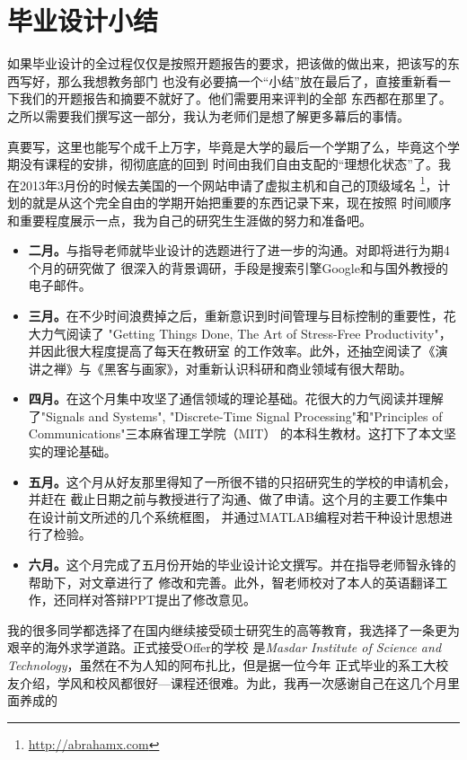 \chapter*{毕业设计小结}
如果毕业设计的全过程仅仅是按照开题报告的要求，把该做的做出来，把该写的东西写好，那么我想教务部门
也没有必要搞一个“小结”放在最后了，直接重新看一下我们的开题报告和摘要不就好了。他们需要用来评判的全部
东西都在那里了。之所以需要我们撰写这一部分，我认为老师们是想了解更多幕后的事情。
\par
真要写，这里也能写个成千上万字，毕竟是大学的最后一个学期了么，毕竟这个学期没有课程的安排，彻彻底底的回到
时间由我们自由支配的“理想化状态”了。我在2013年3月份的时候去美国的一个网站申请了虚拟主机和自己的顶级域名
\footnote{\url{http://abrahamx.com}}，计划的就是从这个完全自由的学期开始把重要的东西记录下来，现在按照
时间顺序和重要程度展示一点，我为自己的研究生生涯做的努力和准备吧。
\begin{itemize}
  \item \textbf{二月。}与指导老师就毕业设计的选题进行了进一步的沟通。对即将进行为期4个月的研究做了
  很深入的背景调研，手段是搜索引擎Google和与国外教授的电子邮件。
  \item \textbf{三月。}在不少时间浪费掉之后，重新意识到时间管理与目标控制的重要性，花大力气阅读了
  "Getting Things Done, The Art of Stress-Free Productivity"，并因此很大程度提高了每天在教研室
  的工作效率。此外，还抽空阅读了《演讲之禅》与《黑客与画家》，对重新认识科研和商业领域有很大帮助。
  \item \textbf{四月。}在这个月集中攻坚了通信领域的理论基础。花很大的力气阅读并理解了"Signals and
  Systems", "Discrete-Time Signal Processing"和"Principles of Communications"三本麻省理工学院（MIT）
  的本科生教材。这打下了本文坚实的理论基础。
  \item \textbf{五月。}这个月从好友那里得知了一所很不错的只招研究生的学校的申请机会，并赶在
  截止日期之前与教授进行了沟通、做了申请。这个月的主要工作集中在设计前文所述的几个系统框图，
  并通过MATLAB编程对若干种设计思想进行了检验。
  \item \textbf{六月。}这个月完成了五月份开始的毕业设计论文撰写。并在指导老师智永锋的帮助下，对文章进行了
  修改和完善。此外，智老师校对了本人的英语翻译工作，还同样对答辩PPT提出了修改意见。
\end{itemize}
我的很多同学都选择了在国内继续接受硕士研究生的高等教育，我选择了一条更为艰辛的海外求学道路。正式接受Offer的学校
是\emph{Masdar Institute of Science and Technology}，虽然在不为人知的阿布扎比，但是据一位今年
正式毕业的系工大校友介绍，学风和校风都很好---课程还很难。为此，我再一次感谢自己在这几个月里面养成的

